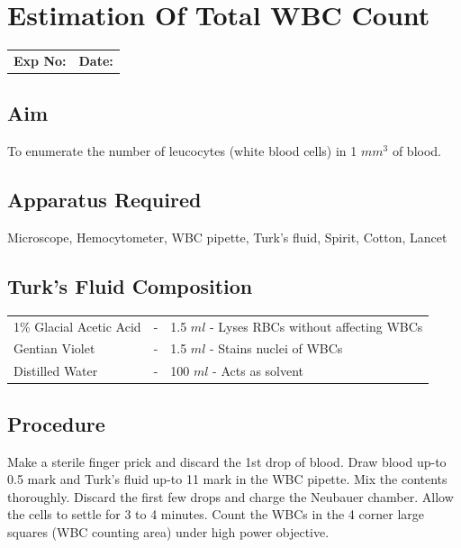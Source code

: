 \documentclass[a4paper,12pt,openany,twoside]{book}
\begin{document}
					\chapter*{\centering Estimation Of Total WBC Count}

					\begin{tabular}{p{4.5in} p{1in}}
						\textbf{Exp No:}  & \textbf{Date:}\\
					\end{tabular}
					\section *{Aim}
					To enumerate the number of leucocytes (white blood cells) in 1 $mm^3$ of blood.
					\section*{Apparatus Required}
					Microscope, Hemocytometer, WBC pipette, Turk’s fluid, Spirit, Cotton, Lancet
					\section*{Turk's Fluid Composition}
					\begin{tabular}{l c l}

						1\% Glacial Acetic Acid	&	-&	1.5 $ml$ - Lyses RBCs without affecting WBCs\\
						Gentian Violet&			-&	1.5 $ml$ - Stains nuclei of WBCs\\
						Distilled Water&		-&	100 $ml$ - Acts as solvent\\

					\end{tabular}
					\section*{Procedure}

					Make a sterile finger prick and discard the 1st drop of blood. Draw blood up-to 0.5 mark and Turk’s fluid up-to 11 mark in the WBC pipette. Mix the contents thoroughly. Discard the first few drops and charge the Neubauer chamber. Allow the cells to settle for 3 to 4 minutes. Count the WBCs in the 4 corner large squares (WBC counting area) under high power objective.
\end{document}
